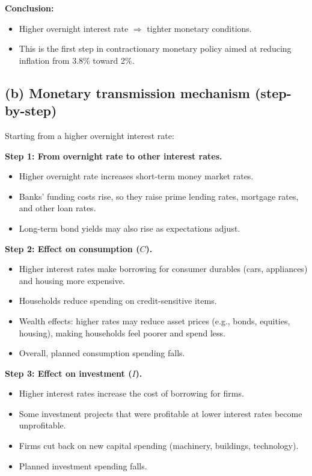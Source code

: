 \documentclass[12pt]{article}
\begin{document}
\textbf{Conclusion:}
\begin{itemize}
    \item Higher overnight interest rate $\Rightarrow$ tighter monetary conditions.
    \item This is the first step in contractionary monetary policy aimed at reducing inflation from 3.8\% toward 2\%.
\end{itemize}

\subsection*{(b) Monetary transmission mechanism (step-by-step)}

Starting from a higher overnight interest rate:

\textbf{Step 1: From overnight rate to other interest rates.}
\begin{itemize}
    \item Higher overnight rate increases short-term money market rates.
    \item Banks' funding costs rise, so they raise prime lending rates, mortgage rates, and other loan rates.
    \item Long-term bond yields may also rise as expectations adjust.
\end{itemize}

\textbf{Step 2: Effect on consumption (\(C\)).}
\begin{itemize}
    \item Higher interest rates make borrowing for consumer durables (cars, appliances) and housing more expensive.
    \item Households reduce spending on credit-sensitive items.
    \item Wealth effects: higher rates may reduce asset prices (e.g., bonds, equities, housing), making households feel poorer and spend less.
    \item Overall, planned consumption spending falls.
\end{itemize}


\newpage
\textbf{Step 3: Effect on investment (\(I\)).}
\begin{itemize}
    \item Higher interest rates increase the cost of borrowing for firms.
    \item Some investment projects that were profitable at lower interest rates become unprofitable.
    \item Firms cut back on new capital spending (machinery, buildings, technology).
    \item Planned investment spending falls.
\end{itemize}
\end{document}
